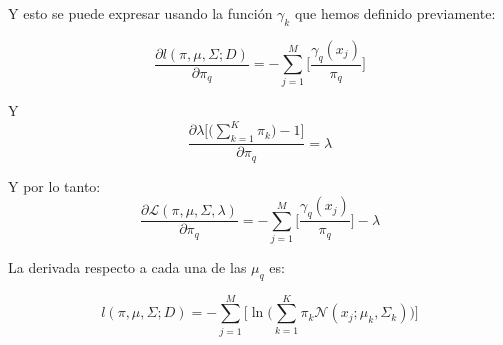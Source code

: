 \documentclass[a5paper]{article}
\begin{document}
\begin{enumerate}
Y esto se puede expresar usando la función $\gamma_k$ que hemos definido previamente:

\begin{equation*}
\frac
{\partial l(\pi, \mu, \Sigma; D)}
{\partial \pi_q} = 
-\sum_{j = 1}^{M}
    \Bigg[
        \frac
        {\gamma_q(x_j)}
        {\pi_q}
    \Bigg]
\end{equation*}

Y
\begin{equation*}
\frac
{\partial \lambda
\Big[
    \Big(
        \sum_{k = 1}^{K} \pi_k
    \Big) - 1
\Big]
}
{\partial \pi_q} = 
\lambda
\end{equation*}

Y por lo tanto:
\begin{equation*}
\frac
{\partial \mathcal{L}(\pi,\mu, \Sigma, \lambda)}
{\partial \pi_q} = 
-\sum_{j = 1}^{M}
    \Bigg[
        \frac
        {\gamma_q(x_j)}
        {\pi_q}
    \Bigg]
- \lambda
\end{equation*}

% 
% 
% 
% 
% 
% 



La derivada respecto a cada una de las $\mu_q$ es:

\begin{equation*}
l(\pi, \mu, \Sigma; D) = -\sum_{j = 1}^{M} \Bigg[ 
\ln\Big(
\sum_{k = 1}^{K} \pi_k \mathcal{N}(x_j; \mu_k, \Sigma_k)
\Big)
\Bigg] 
\end{equation*}


\end{enumerate}
\end{document}
